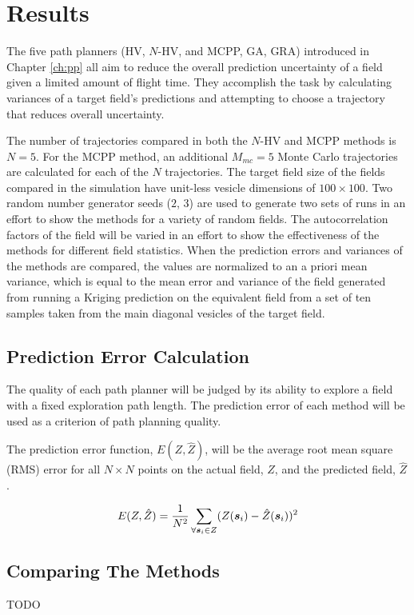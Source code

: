 \chapter{Results}
The five path planners (HV, $N$-HV, and MCPP, GA, GRA) introduced in Chapter \ref{ch:pp} all aim to reduce the overall prediction uncertainty of a field given a limited amount of flight time. They accomplish the task by calculating variances of a target field's predictions and attempting to choose a trajectory that reduces overall uncertainty. 

The number of trajectories compared in both the $N$-HV and MCPP methods is $N=5$. For the MCPP method, an additional $M_{mc}=5$ Monte Carlo trajectories are calculated for each of the $N$ trajectories. The target field size of the fields compared in the simulation have unit-less vesicle dimensions of $100\times 100$. Two random number generator seeds ($2$, $3$) are used to generate two sets of runs in an effort to show the methods for a variety of random fields. The autocorrelation factors of the field will be varied in an effort to show the effectiveness of the methods for different field statistics. When the prediction errors and variances of the methods are compared, the values are normalized to an a priori mean variance, which is equal to the mean error and variance of the field generated from running a Kriging prediction on the equivalent field from a set of ten samples taken from the main diagonal vesicles of the target field.

\section{Prediction Error Calculation}
The quality of each path planner will be judged by its ability to explore a field with a fixed exploration path length. The prediction error of each method will be used as a criterion of path planning quality.

The prediction error function, $E (Z,\hat{Z})$, will be the average root mean square (RMS) error for all $N\times N$ points on the actual field, $Z$, and the predicted field, $\hat{Z}$.

\begin{equation}
E (Z, \hat{Z}) = \frac{1}{N^2}\sum_{\forall {\it{\boldsymbol{s}}}_i \in Z} (Z({\it{\boldsymbol{s}}}_i) - \hat{Z}({\it{\boldsymbol{s}}}_i))^2
\end{equation}



\section{Comparing The Methods}
TODO